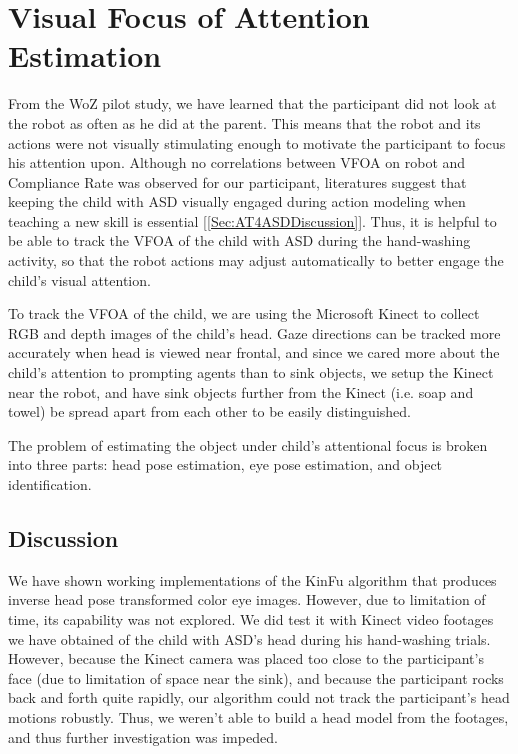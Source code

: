 \chapter{Visual Focus of Attention Estimation}
From the WoZ pilot study, we have learned that the participant did not look at the robot as often as he did at the parent.  This means that the robot and its actions were not visually stimulating enough to motivate the participant to focus his attention upon.  Although no correlations between VFOA on robot and Compliance Rate was observed for our participant, literatures suggest that keeping the child with ASD visually engaged during action modeling when teaching a new skill is essential [\ref{Sec:AT4ASDDiscussion}].  Thus, it is helpful to be able to track the VFOA of the child with ASD during the hand-washing activity, so that the robot actions may adjust automatically to better engage the child's visual attention.

To track the VFOA of the child, we are using the Microsoft Kinect to collect RGB and depth images of the child's head.  Gaze directions can be tracked more accurately when head is viewed near frontal, and since we cared more about the child's attention to prompting agents than to sink objects, we setup the Kinect near the robot, and have sink objects further from the Kinect (i.e. soap and towel) be spread apart from each other to be easily distinguished.

The problem of estimating the object under child's attentional focus is broken into three parts: head pose estimation, eye pose estimation, and object identification.


%
%	
%	







\section{Discussion}
We have shown working implementations of the KinFu algorithm that produces inverse head pose transformed color eye images.  However, due to limitation of time, its capability was not explored.  We did test it with Kinect video footages we have obtained of the child with ASD's head during his hand-washing trials.  However, because the Kinect camera was placed too close to the participant's face (due to limitation of space near the sink), and because the participant rocks back and forth quite rapidly, our algorithm could not track the participant's head motions robustly.  Thus, we weren't able to build a head model from the footages, and thus further investigation was impeded.

